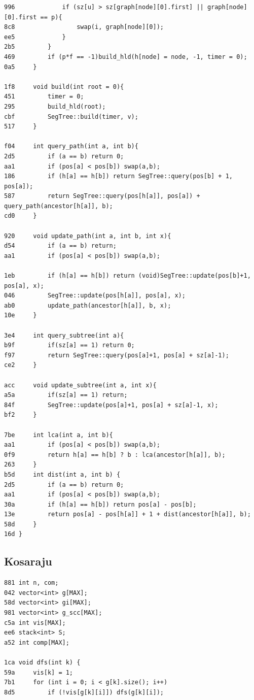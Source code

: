\documentclass[11pt, a4paper, twoside]{article}
\begin{document}
{{\begin{lstlisting}
996             if (sz[u] > sz[graph[node][0].first] || graph[node][0].first == p){
8c8                 swap(i, graph[node][0]);
ee5             }
2b5         }
469         if (p*f == -1)build_hld(h[node] = node, -1, timer = 0);
0a5     }
    
1f8     void build(int root = 0){
451         timer = 0;
295         build_hld(root);
cbf         SegTree::build(timer, v);
517     }
    
f04     int query_path(int a, int b){
2d5         if (a == b) return 0;
aa1         if (pos[a] < pos[b]) swap(a,b);
186         if (h[a] == h[b]) return SegTree::query(pos[b] + 1, pos[a]);
587         return SegTree::query(pos[h[a]], pos[a]) + query_path(ancestor[h[a]], b);
cd0     }
    
920     void update_path(int a, int b, int x){
d54         if (a == b) return;
aa1         if (pos[a] < pos[b]) swap(a,b);
    
1eb         if (h[a] == h[b]) return (void)SegTree::update(pos[b]+1, pos[a], x);
046         SegTree::update(pos[h[a]], pos[a], x);
ab0         update_path(ancestor[h[a]], b, x);
10e     }
    
3e4     int query_subtree(int a){
b9f         if(sz[a] == 1) return 0;
f97         return SegTree::query(pos[a]+1, pos[a] + sz[a]-1);
ce2     }
    
acc     void update_subtree(int a, int x){
a5a         if(sz[a] == 1) return;
84f         SegTree::update(pos[a]+1, pos[a] + sz[a]-1, x);
bf2     }
    
7be     int lca(int a, int b){
aa1         if (pos[a] < pos[b]) swap(a,b);
0f9         return h[a] == h[b] ? b : lca(ancestor[h[a]], b);
263     }
b5d     int dist(int a, int b) {
2d5         if (a == b) return 0;
aa1         if (pos[a] < pos[b]) swap(a,b);
30a         if (h[a] == h[b]) return pos[a] - pos[b];
13e         return pos[a] - pos[h[a]] + 1 + dist(ancestor[h[a]], b);
58d     }
16d }
\end{lstlisting}

\subsection{Kosaraju}
\begin{lstlisting}
881 int n, com;
042 vector<int> g[MAX];
58d vector<int> gi[MAX];
981 vector<int> g_scc[MAX]; 
c5a int vis[MAX];
ee6 stack<int> S;
a52 int comp[MAX];

1ca void dfs(int k) {
59a 	vis[k] = 1;
7b1 	for (int i = 0; i < g[k].size(); i++)
8d5 		if (!vis[g[k][i]]) dfs(g[k][i]);
    

\end{lstlisting}}}
\end{document}
